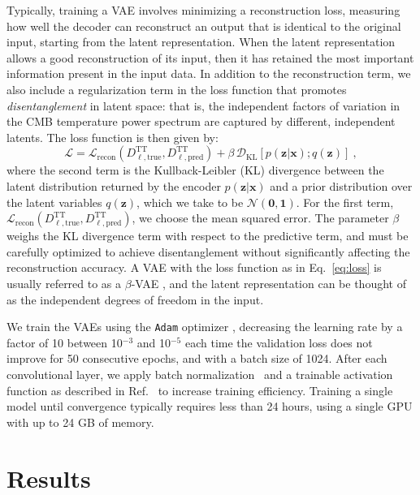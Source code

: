 \documentclass[aps, prd, reprint, superscriptaddress, nofootinbib, bibnotes]{revtex4-2}
\newcommand{\bol}[1]{\boldsymbol{#1}}
\begin{document}
Typically, training a VAE involves minimizing a reconstruction loss, measuring how well the decoder can reconstruct an output that is identical to the original input, starting from the latent representation. When the latent representation allows a good reconstruction of its input, then it has retained the most important information present in the input data. In addition to the reconstruction term, we also include a regularization term in the loss function that promotes \textit{disentanglement} in latent space: that is, the independent factors of variation in the CMB temperature power spectrum are captured by different, independent latents. The loss function is then given by:
\begin{equation}
\mathcal{L} = \mathcal{L}_\mathrm{recon}(D^{\mathrm{TT}}_{\ell, \mathrm{true}}, D^{\mathrm{TT}}_{\ell, \mathrm{pred}}) + \beta \, \mathcal{D}_\mathrm{KL}[p(\bol{z} | \bol{x}); q(\bol{z})] \ ,
\label{eq:loss}
\end{equation}
 where the second term is the Kullback-Leibler (KL) divergence \citep{Kullback1951} between the latent distribution returned by the encoder $p(\bol{z} | \bol{x})$ and a prior distribution over the latent variables $q(\bol{z})$, which we take to be $\mathcal{N}(\bol{0}, \bol{1})$. For the first term, $\mathcal{L}_\mathrm{recon}(D^{\mathrm{TT}}_{\ell, \mathrm{true}}, D^{\mathrm{TT}}_{\ell, \mathrm{pred}})$, we choose the mean squared error. The parameter $\beta$ weighs the KL divergence term with respect to the predictive term, and must be carefully optimized to achieve disentanglement without significantly affecting the reconstruction accuracy. 
 A VAE with the loss function as in Eq.~\eqref{eq:loss} is usually referred to as a $\beta$-VAE \cite{Higgins17}, and the latent representation can be thought of as the independent degrees of freedom in the input.

We train the VAEs using the \texttt{Adam} optimizer \cite{Kingma15}, decreasing the learning rate by a factor of 10 between 10$^{-3}$ and 10$^{-5}$ each time the validation loss does not improve for 50 consecutive epochs, and with a batch size of 1024. After each convolutional layer, we apply batch normalization~\cite{Ioffe15} and a trainable activation function as described in Ref.~\cite{Alsing20} to increase training efficiency. Training a single model until convergence typically requires less than 24 hours, using a single GPU with up to 24 GB of memory.


\section{Results}
\label{sec:results}
\end{document}
